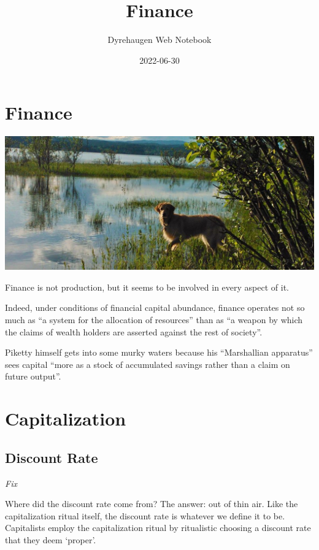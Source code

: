 \documentclass[
]{book}
\title{Finance}
\author{Dyrehaugen Web Notebook}
\date{2022-06-30}
\begin{document}
\maketitle

{
\setcounter{tocdepth}{1}
\tableofcontents
}
\hypertarget{finance}{%
\chapter{Finance}\label{finance}}

\includegraphics{fig/zelda.jpg}

Finance is not production, but it seems to be involved in every aspect of it.

Indeed, under conditions of financial capital abundance,
finance operates not so much as ``a system for the allocation of resources''
than as ``a weapon by which the claims of wealth holders are
asserted against the rest of society''.

Piketty himself gets into some murky waters because his
``Marshallian apparatus'' sees capital ``more as a stock of accumulated savings rather
than a claim on future output''.

\hypertarget{capitalization}{%
\chapter{Capitalization}\label{capitalization}}

\hypertarget{discount-rate}{%
\section{Discount Rate}\label{discount-rate}}

\emph{Fix}

Where did the discount rate come from? The answer: out of thin air. Like the capitalization ritual itself, the discount rate is whatever we define it to be. Capitalists employ the capitalization ritual by ritualistic choosing a discount rate that they deem `proper'.
\end{document}
